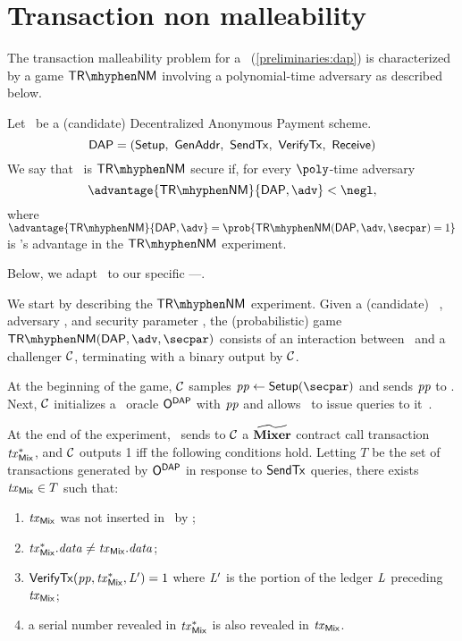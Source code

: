 
\chapter{Transaction non malleability}\label{appendix:trnm}

The transaction malleability problem for a \dapscheme~(\cref{preliminaries:dap}) is characterized by a game $\trnm$ involving a polynomial-time adversary \adv{} as described below.

\begin{definition}
Let \dapscheme~be a (candidate) Decentralized Anonymous Payment scheme.
\[
  \dapscheme = (\setup,\ \genadd,\ \sendtx,\ \verifytx,\ \receive)
\]
We say that \dapscheme~is $\trnm$ secure if, for every $\poly$-time adversary \adv~
\[
    \advantage{\trnm}{\dapscheme, \adv} < \negl,
\]
where $\advantage{\trnm}{\dapscheme ,\adv} = \prob{\trnm(\dapscheme, \adv, \secpar) = 1}$ is \adv’s advantage in the $\trnm$ experiment.
\end{definition}

Below, we adapt~\cite[Appendix C.2]{sasson2014zerocash} to our specific \dapscheme---\zeth.

We start by describing the $\trnm$ experiment.
Given a (candidate) \zeth~\dapscheme, adversary \adv, and security parameter \secpar, the (probabilistic) game $\trnm(\dapscheme, \adv, \secpar)$ consists of an interaction between \adv~and a challenger $\mathcal{C}$, terminating with a binary output by $\mathcal{C}$.

At the beginning of the game, $\mathcal{C}$ samples $\pparams \gets \setup(\secpar)$ and sends $\mathit{pp}$ to \adv. Next, $\mathcal{C}$ initializes a \dapscheme~oracle $\mathsf{O}^{\mathsf{DAP}}$ with $\mathit{pp}$ and allows \adv~to issue queries to it~\cite[Appendix B]{zethpaper}.

At the end of the experiment, \adv~sends to $\mathcal{C}$ a $\widetilde{\mathbf{Mixer}}$ contract call transaction $\mathit{tx}^*_{\mathsf{Mix}}$, and $\mathcal{C}$ outputs 1 iff the following conditions hold. Letting $T$ be the set of transactions generated by $\mathsf{O}^{\mathsf{DAP}}$ in response to $\mathsf{SendTx}$ queries, there exists $\mathit{tx}_{\mathsf{Mix}} \in T$ such that:
\begin{enumerate}
    \item $\mathit{tx}_{\mathsf{Mix}}$ was not inserted in \ledger~by \adv;
    \item $\mathit{tx}^*_{\mathsf{Mix}}.\mathit{data} \neq \mathit{tx}_{\mathsf{Mix}}.\mathit{data}$;
    \item $\mathsf{VerifyTx}(\mathit{pp}, \mathit{tx}^*_{\mathsf{Mix}}, \mathit{L}') = 1$ where $\mathit{L}'$ is the portion of the ledger $\mathit{L}$ preceding $\mathit{tx}_{\mathsf{Mix}}$;
    \item a serial number revealed in $\mathit{tx}^*_{\mathsf{Mix}}$ is also revealed in $\mathit{tx}_{\mathsf{Mix}}$.
\end{enumerate}

